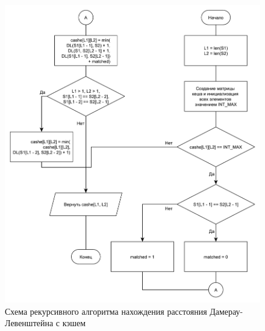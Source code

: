 \begin{figure}[h]
	\centering
	\includegraphics[scale=0.6]{images/dlev_req_cache.pdf}
	\caption{Схема рекурсивного алгоритма нахождения расстояния Дамерау-Левенштейна с кэшем}
	\label{img:dlev_req_cache}
\end{figure}

